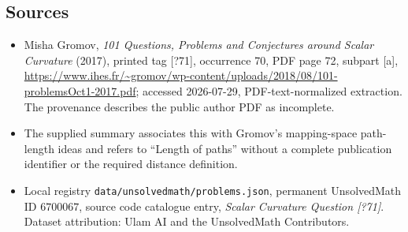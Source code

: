 \documentclass[11pt]{article}
\begin{document}
\subsection{Sources}
\begin{itemize}
\item Misha Gromov, \emph{101 Questions, Problems and Conjectures around Scalar Curvature} (2017), printed tag [?71], occurrence 70, PDF page 72, subpart [a], \url{https://www.ihes.fr/~gromov/wp-content/uploads/2018/08/101-problemsOct1-2017.pdf}; accessed 2026-07-29, PDF-text-normalized extraction. The provenance describes the public author PDF as incomplete.
\item The supplied summary associates this with Gromov's mapping-space path-length ideas and refers to ``Length of paths'' without a complete publication identifier or the required distance definition.
\item Local registry \texttt{data/unsolvedmath/problems.json}, permanent UnsolvedMath ID $6700067$, source code catalogue entry, \emph{Scalar Curvature Question [?71]}. Dataset attribution: Ulam AI and the UnsolvedMath Contributors.
\end{itemize}
\end{document}
